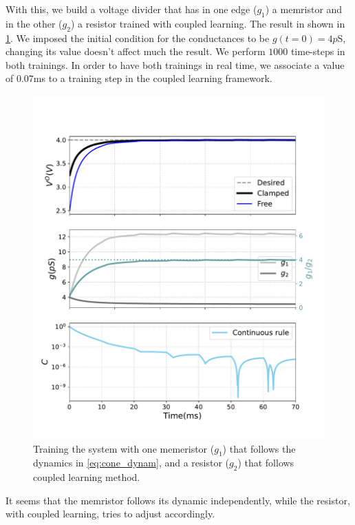 \documentclass[10.5pt]{article}
\begin{document}
With this, we build a voltage divider that has in one edge ($g_1$) a memristor and in the other ($g_2$) a resistor trained with coupled learning. The result in shown in \cref{fig:memr_coupled_simple}. We imposed the initial condition for the conductances to be $g(t=0)=4p$S, changing its value doesn't affect much the result. We perform $1000$ time-steps in both trainings. In order to have both trainings in real time, we associate a value of $0.07$ms to a training step in the coupled learning framework.
\begin{figure}[h]
    \centering
    \includegraphics[width=0.6\columnwidth]{../figures_tex/memr_coupled_simple.pdf}
    \caption{Training the system with one memeristor ($g_1$) that follows the dynamics in \cref{eq:cone_dynam}, and a resistor ($g_2$) that follows coupled learning method.}
    \label{fig:memr_coupled_simple}
\end{figure}
It seems that the memristor follows its dynamic independently, while the resistor, with coupled learning, tries to adjust accordingly.
\end{document}

